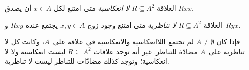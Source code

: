 \documentclass[../../../include/open-logic-section]{subfiles}
\begin{document}
\begin{defn}[اللاانعكاسية]
العلاقة $R \subseteq A^2$ \emph{لا انعكاسية} متى امتنع لكل $x \in
A$ أن يصدق $Rxx$.
\end{defn}

\begin{defn}[اللاتناظرية]
العلاقة $R \subseteq A^2$ \emph{لا تناظرية} متى امتنع وجود زوج
$x,y\in A$ يجتمع عنده $Rxy$ و~$Ryx$.
\end{defn}

فإذا كان $A \neq \emptyset$ لم تجتمع اللاانعكاسية والانعكاسية في
علاقة على~$A$، وكانت كل لا تناظرية على~$A$ مضادّة للتناظر.
غير أنه توجد علاقات $R \subseteq A^2$ ليست انعكاسية ولا لا انعكاسية؛
وتوجد كذلك مضادّات للتناظر ليست لا تناظرية.
\end{document}
